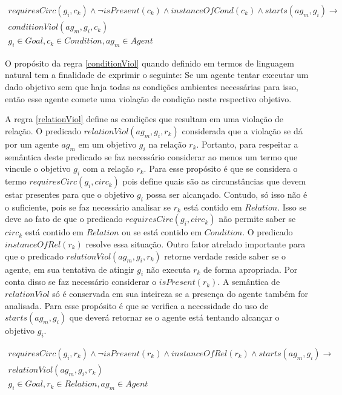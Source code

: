\begin{eqnarray}\label{conditionViol}\nonumber
	requiresCirc(g_i,c_k) \wedge \neg isPresent(c_k) \wedge instanceOfCond(c_k) \wedge starts(ag_m,g_i)  \to \\ \nonumber   
	conditionViol(ag_m,g_i,c_k) \nonumber \\  
    g_i \in Goal, c_k \in Condition, ag_m \in Agent
\end{eqnarray}

O propósito da regra \ref{conditionViol} quando definido em termos de linguagem natural tem a finalidade de exprimir o seguinte: Se um agente tentar executar um dado objetivo sem que haja todas as condições ambientes necessárias para isso, então esse agente comete uma violação de condição neste respectivo objetivo. 

A regra \ref{relationViol} define as condições que resultam em uma violação de relação. O predicado $relationViol(ag_m,g_i,r_k)$ considerada que a violação se dá por um agente $ag_m$ em um objetivo $g_i$ na relação $r_k$. Portanto, para respeitar a semântica deste predicado se faz necessário considerar ao menos um termo que vincule o objetivo $g_i$ com a relação $r_k$. Para esse propósito é que se considera o termo $requiresCirc(g_i,circ_k)$ pois define quais são as circunstâncias que devem estar presentes para que o objetivo $g_i$ possa ser alcançado. Contudo, só isso não é o suficiente, pois se faz necessário analisar se $r_k$ está contido em $Relation$. Isso se deve ao fato de que o predicado $requiresCirc(g_i,circ_k)$ não permite saber se $circ_k$ está contido em $Relation$ ou se está contido em $Condition$. O predicado $instanceOfRel(r_k)$ resolve essa situação. Outro fator atrelado importante para que o predicado $relationViol(ag_m,g_i,r_k)$ retorne verdade reside saber se o agente, em sua tentativa de atingir $g_i$ não executa $r_k$ de forma apropriada. Por conta disso se faz necessário considerar o $isPresent(r_k)$. A semântica de $relationViol$ só é conservada em sua inteireza se a presença do agente também for analisada. Para esse propósito é que se verifica a necessidade do uso de $starts(ag_m,g_i)$ que deverá retornar se o agente está tentando alcançar o objetivo $g_i$.   

\begin{eqnarray}\label{relationViol}\nonumber
	requiresCirc(g_i,r_k)\wedge \neg isPresent(r_k) \wedge instanceOfRel(r_k) \wedge starts(ag_m,g_i) \to \nonumber \\
	relationViol(ag_m,g_i,r_k) \nonumber \\  
    g_i \in Goal, r_k \in Relation, ag_m \in Agent
\end{eqnarray}

